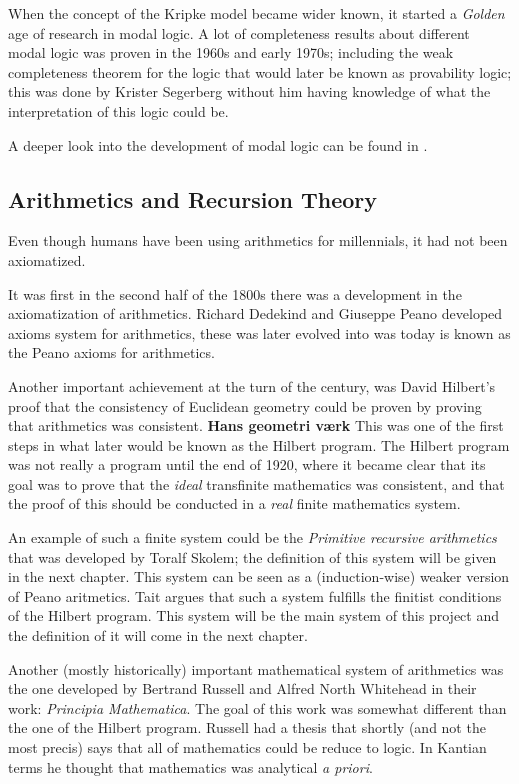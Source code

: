 \documentclass[../main.tex]{subfiles}
\begin{document}
When the concept of the Kripke model became wider known, it started a
\textit{Golden} age of research in modal logic. A lot of completeness results
about different modal logic was proven in the 1960s and early 1970s; including
the weak completeness theorem for the logic that would later be known as
provability logic; this was done by Krister Segerberg without him having
knowledge of what the interpretation of this logic could be.

A deeper look into the development of modal logic can be found in
\cite{Goldblatt2003}.
\subsection{Arithmetics and Recursion Theory}


Even though humans have been using arithmetics for millennials, it had not been
axiomatized.

It was first in  the second half of the 1800s there was a development in the axiomatization
of arithmetics. Richard Dedekind and Giuseppe Peano developed axioms system for arithmetics,
these was later evolved into was today is known as the Peano axioms for
arithmetics. 

Another important achievement at the turn of the century, was David Hilbert's
proof that the consistency of Euclidean geometry could be proven by proving
that arithmetics was consistent. \textbf{Hans geometri værk} This was one of the first steps in what later
would be known as the Hilbert program. 
The Hilbert program was not really a program until the end of 1920, where it
became clear that its goal was to prove that the \textit{ideal} transfinite mathematics was
consistent, and that the proof of this should be conducted in a \textit{real}
finite mathematics system.

An example of such a finite system could be the \textit{Primitive recursive
arithmetics} that was developed by Toralf Skolem; the definition of this system
will be given in the next chapter. This system can be seen as a
(induction-wise) weaker version of Peano aritmetics. Tait  argues
that such a system fulfills the finitist conditions of the Hilbert program.
This system will be the main system of this project and the definition of it
will come in the next chapter.

Another (mostly historically) important mathematical system of arithmetics was
the one developed by Bertrand Russell and Alfred North Whitehead in their work:
\textit{Principia Mathematica}. The goal of this work was somewhat different
than the one of the Hilbert program. Russell had a thesis that shortly (and not
the most precis) says that all of mathematics could be reduce to logic. In
Kantian terms he thought that mathematics was analytical \textit{a priori}. 
\end{document}

